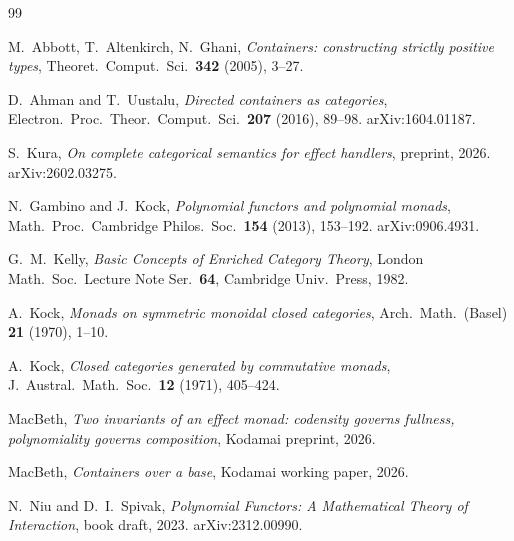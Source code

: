 \documentclass[11pt]{amsart}
\theoremstyle{plain}
\theoremstyle{definition}
\theoremstyle{remark}
\begin{document}
\begin{thebibliography}{99}

 M.~Abbott, T.~Altenkirch, N.~Ghani,
\emph{Containers: constructing strictly positive types},
Theoret.\ Comput.\ Sci.\ \textbf{342} (2005), 3--27.

 D.~Ahman and T.~Uustalu,
\emph{Directed containers as categories},
Electron.\ Proc.\ Theor.\ Comput.\ Sci.\ \textbf{207} (2016), 89--98. arXiv:1604.01187.

 S.~Kura,
\emph{On complete categorical semantics for effect handlers},
preprint, 2026. arXiv:2602.03275.

 N.~Gambino and J.~Kock,
\emph{Polynomial functors and polynomial monads},
Math.\ Proc.\ Cambridge Philos.\ Soc.\ \textbf{154} (2013), 153--192. arXiv:0906.4931.

 G.~M.~Kelly,
\emph{Basic Concepts of Enriched Category Theory},
London Math.\ Soc.\ Lecture Note Ser.\ \textbf{64}, Cambridge Univ.\ Press, 1982.

 A.~Kock,
\emph{Monads on symmetric monoidal closed categories},
Arch.\ Math.\ (Basel) \textbf{21} (1970), 1--10.

 A.~Kock,
\emph{Closed categories generated by commutative monads},
J.\ Austral.\ Math.\ Soc.\ \textbf{12} (1971), 405--424.

 MacBeth,
\emph{Two invariants of an effect monad: codensity governs fullness, polynomiality governs
composition}, Kodamai preprint, 2026.

 MacBeth,
\emph{Containers over a base}, Kodamai working paper, 2026.

 N.~Niu and D.~I.~Spivak,
\emph{Polynomial Functors: A Mathematical Theory of Interaction},
book draft, 2023. arXiv:2312.00990.

\end{thebibliography}
\end{document}
